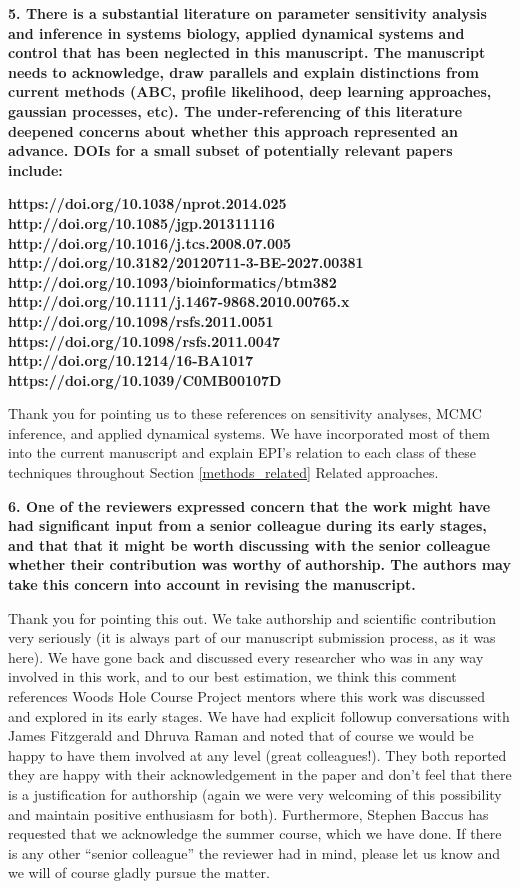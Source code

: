 \documentclass[11pt,a4paper]{article}
\begin{document}
\textbf{5. There is a substantial literature on parameter sensitivity analysis and inference in systems biology, applied dynamical systems and control that has been neglected in this manuscript. The manuscript needs to acknowledge, draw parallels and explain distinctions from current methods (ABC, profile likelihood, deep learning approaches, gaussian processes, etc). The under-referencing of this literature deepened concerns about whether this approach represented an advance. DOIs for a small subset of potentially relevant papers include:}

\textbf{https://doi.org/10.1038/nprot.2014.025 \\
http://doi.org/10.1085/jgp.201311116 \\
http://doi.org/10.1016/j.tcs.2008.07.005 \\
http://doi.org/10.3182/20120711-3-BE-2027.00381 \\
http://doi.org/10.1093/bioinformatics/btm382 \\
http://doi.org/10.1111/j.1467-9868.2010.00765.x \\
http://doi.org/10.1098/rsfs.2011.0051 \\
https://doi.org/10.1098/rsfs.2011.0047 \\
http://doi.org/10.1214/16-BA1017 \\
https://doi.org/10.1039/C0MB00107D}

Thank you for pointing us to these references on sensitivity analyses, MCMC inference, and applied dynamical systems.  
We have incorporated most of them into the current manuscript and explain EPI’s relation to each class of these techniques throughout Section \ref{methods_related} Related approaches.

\textbf{6. One of the reviewers expressed concern that the work might have had significant input from a senior colleague during its early stages, and that that it might be worth discussing with the senior colleague whether their contribution was worthy of authorship. The authors may take this concern into account in revising the manuscript.}

Thank you for pointing this out.  We take authorship and scientific contribution very seriously (it is always part of our manuscript submission process, as it was here).  We have gone back and discussed every researcher who was in any way involved in this work, and to our best estimation, we think this comment references Woods Hole Course Project mentors where this work was discussed and explored in its early stages.   We have had explicit followup conversations with James Fitzgerald and Dhruva Raman and noted that of course we would be happy to have them involved at any level (great colleagues!).  They both reported they are happy with their acknowledgement in the paper and don't feel that there is a justification for authorship (again we were very welcoming of this possibility and maintain positive enthusiasm for both).  Furthermore, Stephen Baccus has requested that we acknowledge the summer course, which we have done.  If there is any other ``senior colleague'' the reviewer had in mind, please let us know and we will of course gladly pursue the matter. 
\end{document}
